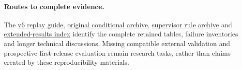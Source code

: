 \documentclass[11pt,a4paper]{article}
\begin{document}
\paragraph{Routes to complete evidence.}
The \href{https://github.com/ByronLi0207/financial-mathematics-paper-20261020/blob/revision-v7-final/protocol/revision-v6/REPLAY.md}{v6 replay guide},
\href{https://github.com/ByronLi0207/financial-mathematics-paper-20261020/blob/revision-v7-final/results/revision-20261022/README.md}{original conditional archive},
\href{https://github.com/ByronLi0207/financial-mathematics-paper-20261020/blob/revision-v7-final/results/supervisor-20261023/r6/README.md}{supervisor rule archive} and
\href{https://github.com/ByronLi0207/financial-mathematics-paper-20261020/blob/revision-v7-final/EXTENDED_RESULTS.md}{extended-results index} identify the
complete retained tables, failure inventories and longer technical discussions.
Missing compatible external validation and prospective first-release evaluation
remain research tasks, rather than claims created by these reproducibility
materials.
\end{document}
